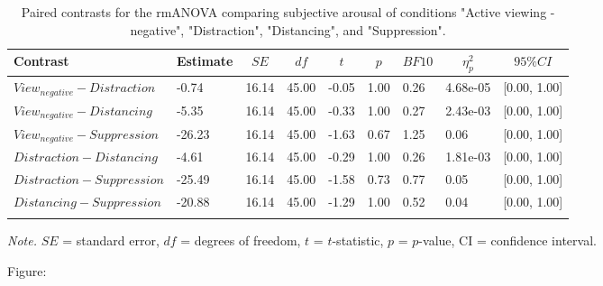 \documentclass[
  man,floatsintext]{apa6}
\begin{document}
\begin{table}[H]

\begin{center}
\begin{threeparttable}

\caption{\label{tab:unnamed-chunk-5}Paired contrasts for the rmANOVA comparing subjective arousal of conditions "Active viewing - negative", "Distraction", "Distancing", and "Suppression".}

\begin{tabular}{lllllllll}
\toprule
Contrast & \multicolumn{1}{c}{Estimate} & \multicolumn{1}{c}{$SE$} & \multicolumn{1}{c}{$df$} & \multicolumn{1}{c}{$t$} & \multicolumn{1}{c}{$p$} & \multicolumn{1}{c}{$BF10$} & \multicolumn{1}{c}{$\eta_{p}^{2}$} & \multicolumn{1}{c}{$95\% CI$}\\
\midrule
$View_{negative} - Distraction$ & -0.74 & 16.14 & 45.00 & -0.05 & 1.00 & 0.26 & 4.68e-05 & {}[0.00, 1.00]\\
$View_{negative} - Distancing$ & -5.35 & 16.14 & 45.00 & -0.33 & 1.00 & 0.27 & 2.43e-03 & {}[0.00, 1.00]\\
$View_{negative} - Suppression$ & -26.23 & 16.14 & 45.00 & -1.63 & 0.67 & 1.25 & 0.06 & {}[0.00, 1.00]\\
$Distraction - Distancing$ & -4.61 & 16.14 & 45.00 & -0.29 & 1.00 & 0.26 & 1.81e-03 & {}[0.00, 1.00]\\
$Distraction - Suppression$ & -25.49 & 16.14 & 45.00 & -1.58 & 0.73 & 0.77 & 0.05 & {}[0.00, 1.00]\\
$Distancing - Suppression$ & -20.88 & 16.14 & 45.00 & -1.29 & 1.00 & 0.52 & 0.04 & {}[0.00, 1.00]\\
\bottomrule
\addlinespace
\end{tabular}

\begin{tablenotes}[para]
\normalsize{\textit{Note.} $SE$ = standard error, $df$ = degrees of freedom, $t$ = $t$-statistic, $p$ = $p$-value, CI = confidence interval.}
\end{tablenotes}

\end{threeparttable}
\end{center}

\end{table}

Figure:
\end{document}
